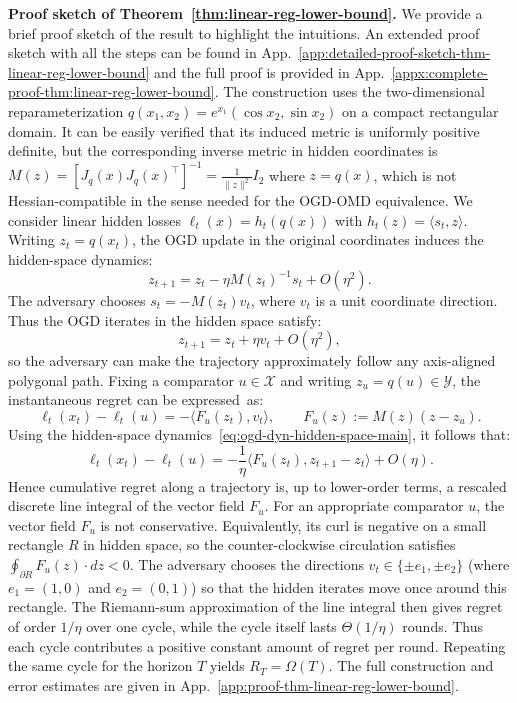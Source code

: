 \documentclass[a4paper,11pt,fullpage]{article}
\def\X{{\mathcal X}}
\def\Y{{\mathcal Y}}
\theoremstyle{plain}
\theoremstyle{definition}
\theoremstyle{plain}
\begin{document}
\noindent\textbf{Proof sketch of Theorem~\ref{thm:linear-reg-lower-bound}.} We provide a brief proof sketch of the result to highlight the intuitions. An extended proof sketch with all the steps can be found in App.~\ref{app:detailed-proof-sketch-thm-linear-reg-lower-bound} and the full proof is provided in App.~\ref{appx:complete-proof-thm:linear-reg-lower-bound}. 
The construction uses the two-dimensional reparameterization
$q(x_1,x_2)=e^{x_1}(\cos x_2,\sin x_2)$ on a compact rectangular domain. 
It can be easily verified that its induced metric is uniformly positive definite, but the corresponding inverse metric in hidden coordinates is $M(z)= [J_q(x) J_q(x)^{\top}]^{-1} = \frac{1}{\|z\|^2}I_2$ where $z = q(x)$, which is not Hessian-compatible in the sense needed for the OGD-OMD equivalence.
We consider linear hidden losses $\ell_t(x)=h_t(q(x))$ with $h_t(z)=\langle s_t,z\rangle$. 
Writing $z_t=q(x_t)$, the OGD update in the original coordinates induces the hidden-space dynamics: 
\begin{equation}
\label{eq:ogd-dyn-hidden-space-main}
    z_{t+1} = z_t-\eta M(z_t)^{-1}s_t + O(\eta^2).
\end{equation}
The adversary chooses $s_t=-M(z_t)v_t$, where $v_t$ is a unit coordinate direction. 
Thus the OGD iterates in the hidden space satisfy:
\begin{equation*}
    z_{t+1}=z_t+\eta v_t+O(\eta^2),
\end{equation*}
so the adversary can make the trajectory approximately follow any axis-aligned polygonal path.
Fixing a comparator $u \in \X$ and writing $z_u=q(u) \in \Y$, the instantaneous regret can be expressed~as: 
\begin{equation*}
    \ell_t(x_t)-\ell_t(u)
    =
    -\langle F_u(z_t),v_t\rangle,
    \qquad
    F_u(z):=M(z)(z-z_u).
\end{equation*}
Using the hidden-space dynamics~\eqref{eq:ogd-dyn-hidden-space-main}, it follows that: 
\begin{equation*}
    \ell_t(x_t)-\ell_t(u)
    =
    -\frac{1}{\eta}
    \langle F_u(z_t),z_{t+1}-z_t\rangle
    +O(\eta).
\end{equation*}
Hence cumulative regret along a trajectory is, up to lower-order terms, a rescaled discrete line integral of the vector field $F_u$. For an appropriate comparator $u$, the vector field $F_u$ is not conservative. Equivalently, its curl is negative on a small rectangle $R$ in hidden space, so the counter-clockwise circulation satisfies $\oint_{\partial R} F_u(z)\cdot dz < 0.$ 
The adversary chooses the directions $v_t\in\{\pm e_1,\pm e_2\}$ (where $e_1 = (1,0)$ and $e_2 = (0,1)$) so that the hidden iterates move once around this rectangle. 
The Riemann-sum approximation of the line integral then gives regret of order $1/\eta$ over one cycle, while the cycle itself lasts $\Theta(1/\eta)$ rounds. 
Thus each cycle contributes a positive constant amount of regret per round. 
Repeating the same cycle for the horizon $T$ yields $R_T=\Omega(T)$. 
The full construction and error estimates are given in App.~\ref{app:proof-thm-linear-reg-lower-bound}. 
\end{document}
